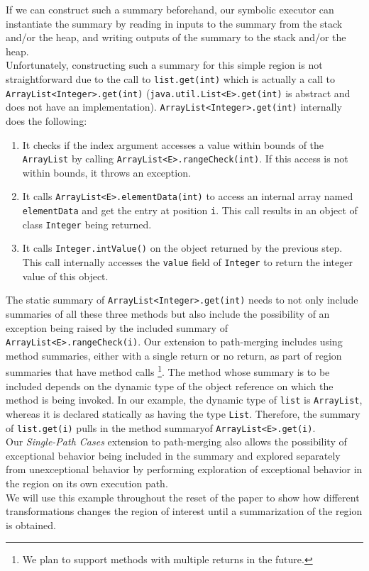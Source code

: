 %
If we can construct such a summary beforehand, our symbolic executor can instantiate the summary by reading in inputs to
the summary from the stack and/or the heap, and writing outputs of the summary to the stack and/or the heap.\\
%
Unfortunately, constructing such a summary for this simple region is not straightforward due to the
call to {\tt list.get(int)} which is actually a call to {\tt ArrayList<Integer>.get(int)} ({\tt java.util.List<E>.get(int)} is abstract and does not have an implementation).
%
{\tt ArrayList<Integer>.get(int)} internally does the following:
%
\begin{enumerate}
\item It checks if the index argument accesses a value within bounds of the {\tt ArrayList} by calling {\tt ArrayList<E>.rangeCheck(int)}. If this access is not within bounds, it throws an exception.
%
\item It calls {\tt ArrayList<E>.elementData(int)} to access an internal array named {\tt elementData} and get the entry at position {\tt i}. This call results in an object of class {\tt Integer} being returned.
%
\item It calls {\tt Integer.intValue()} on the object returned by the previous step. This call internally accesses the {\tt value} field of {\tt Integer} to return the integer value of this object.
%
\end{enumerate}

The static summary of {\tt ArrayList<Integer>.get(int)} needs to not only include summaries of all these three methods but
also include the possibility of an exception being raised by the included summary of {\tt ArrayList<E>.rangeCheck(i)}.
%
Our extension to path-merging includes using method summaries, either with a single return or no return, as part of region summaries that have method calls \footnote{We plan to support methods with multiple returns in the future.}.
%
The method whose summary is to be included depends on the dynamic type of the object reference on which the method is being invoked.
%
In our example, the dynamic type of {\tt list} is {\tt ArrayList}, whereas it is declared statically as having the type {\tt List}.
%
Therefore, the summary of {\tt list.get(i)} pulls in the method summaryof {\tt ArrayList<E>.get(i)}.\\
%
Our \textit{Single-Path Cases} extension to path-merging also allows the possibility of exceptional behavior being
included in the summary and explored separately from unexceptional behavior by performing exploration of exceptional
behavior in the region on its own execution path.\\

We will use this example throughout the reset of the paper to show how different transformations changes the region of interest until a summarization of the region is obtained. 
%
